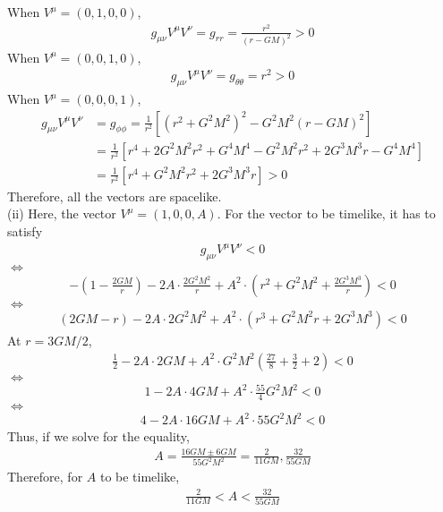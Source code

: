 \documentclass[12pt]{article}
\begin{document}
When $V^{\mu} = \left(0, 1, 0, 0\right)$,
\begin{align}
g_{\mu \nu} V^{\mu} V^{\nu} = g_{rr} = \frac{r^2}{\left(r - GM\right)^2} > 0 
\end{align}
When $V^{\mu} = \left(0, 0, 1, 0\right)$,
\begin{align}
g_{\mu \nu} V^{\mu} V^{\nu} = g_{\theta \theta} = r^2 > 0 
\end{align}
When $V^{\mu} = \left(0, 0, 0, 1\right)$,
\begin{align}
g_{\mu \nu} V^{\mu} V^{\nu} &= g_{\phi \phi} = \frac{1}{r^2} \left[ \left(r^2 + G^2M^2\right)^2 - G^2M^2 \left(r - GM\right)^2 \right] \nonumber \\
&= \frac{1}{r^2} \left[ r^4 + 2G^2M^2r^2 + G^4M^4  - G^2M^2 r^2 + 2 G^3M^3 r - G^4M^4 \right] \nonumber \\
&= \frac{1}{r^2} \left[ r^4 + G^2M^2r^2 + 2 G^3M^3 r \right] > 0 
\end{align}
Therefore, all the vectors are spacelike.\\
(ii) Here, the vector $V^{\mu} = (1,0,0,A)$. For the vector to be timelike, it has to satisfy
\begin{align}
g_{\mu \nu} V^{\mu} V^{\nu} < 0
\end{align}
$\Leftrightarrow$
\begin{align}
- \left(1 - \frac{2 G M}{r} \right) - 2 A \cdot \frac{2 G^2 M^2}{r} + A^2 \cdot \left( r^2 + G^2M^2 + \frac{2 G^3M^3}{r} \right)  < 0
\end{align}
$\Leftrightarrow$
\begin{align}
\left(2GM - r\right) - 2A \cdot 2 G^2 M^2 + A^2 \cdot \left( r^3 + G^2 M^2r + 2 G^3 M^3 \right)  < 0
\end{align}
At $r = 3GM/2$,
\begin{align}
\frac{1}{2} - 2A \cdot 2GM + A^2 \cdot G^2M^2\left( \frac{27}{8} + \frac{3}{2} + 2\right)  < 0
\end{align}
$\Leftrightarrow$
\begin{align}
1 - 2A \cdot 4GM + A^2 \cdot \frac{55}{4}G^2M^2  < 0
\end{align}
$\Leftrightarrow$
\begin{align}
4 - 2A \cdot 16GM + A^2 \cdot 55G^2M^2  < 0
\end{align}
Thus, if we solve for the equality,
\begin{align}
A = \frac{16 GM \pm 6GM}{55 G^2M^2} = \frac{2}{11GM}, \frac{32}{55GM}
\end{align}
Therefore, for $A$ to be timelike,
\begin{align}
\frac{2}{11GM} < A < \frac{32}{55GM}
\end{align}
\end{document}
